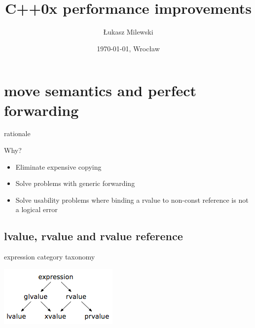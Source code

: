 \documentclass{beamer}
\title{C++0x performance improvements}
\author{Łukasz Milewski}
\institute{Uniwersytet Wrocławski}
\date{\today, Wrocław}
\begin{document}
\begin{frame}
  \titlepage
\end{frame}

\begin{frame}
  \tableofcontents
\end{frame}

\section{move semantics and perfect forwarding}
\begin{frame}{rationale}
  \begin{block}{Why?}
    \begin{itemize}
    \item Eliminate expensive copying
    \item Solve problems with generic forwarding
    \item Solve usability problems where binding a rvalue to non-const reference is not a logical error
    \end{itemize}
  \end{block}
\end{frame}

\subsection{lvalue, rvalue and rvalue reference}
\begin{frame}{expression category taxonomy}
  \begin{center}
    \includegraphics[5cm]{valuetaxonomy.png}
  \end{center}
\end{frame}
\end{document}
